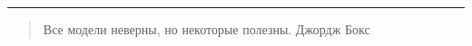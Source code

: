 \documentclass[11pt,a4paper]{article}
\begin{document}
    \begin{center}\rule{0.5\linewidth}{0.5pt}\end{center}


\begin{quote}
  Все модели неверны, но некоторые полезны. Джордж Бокс
\end{quote}


%
%
%
%
%
%
%
\end{document}
